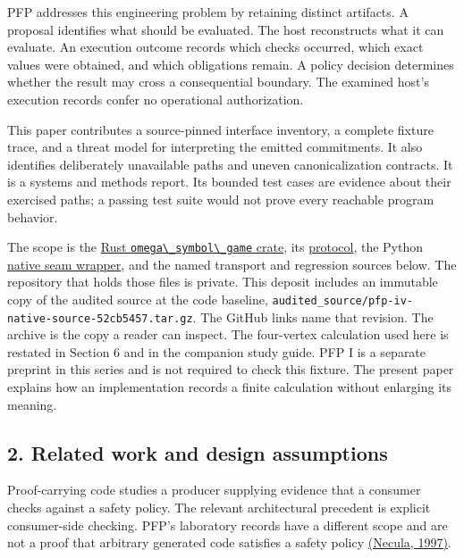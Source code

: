 \documentclass[
  11pt,
]{article}
\newcommand{\passthrough}[1]{#1}
\begin{document}
PFP addresses this engineering problem by retaining distinct artifacts.
A proposal identifies what should be evaluated. The host reconstructs
what it can evaluate. An execution outcome records which checks
occurred, which exact values were obtained, and which obligations
remain. A policy decision determines whether the result may cross a
consequential boundary. The examined host's execution records confer no
operational authorization.

This paper contributes a source-pinned interface inventory, a complete
fixture trace, and a threat model for interpreting the emitted
commitments. It also identifies deliberately unavailable paths and
uneven canonicalization contracts. It is a systems and methods report.
Its bounded test cases are evidence about their exercised paths; a
passing test suite would not prove every reachable program behavior.

The scope is the
\href{https://github.com/dbccpage/the_symbol_game/tree/52cb5457f6c485ba548cfd292f6012a941ed22cf/omega_engine/crates_rs/omega_symbol_game}{Rust
\passthrough{\lstinline!omega\_symbol\_game!} crate}, its
\href{https://github.com/dbccpage/the_symbol_game/blob/52cb5457f6c485ba548cfd292f6012a941ed22cf/omega_engine/crates_rs/omega_symbol_game/src/protocol.rs}{protocol},
the Python
\href{https://github.com/dbccpage/the_symbol_game/blob/52cb5457f6c485ba548cfd292f6012a941ed22cf/omega_engine_symbol_game/ffi.py}{native
seam wrapper}, and the named transport and regression sources below. The
repository that holds those files is private. This deposit includes an
immutable copy of the audited source at the code baseline,
\nolinkurl{audited_source/pfp-iv-native-source-52cb5457.tar.gz}. The GitHub
links name that revision. The archive is the copy a reader can inspect.
The four-vertex calculation used here is restated in Section 6 and in
the companion study guide. PFP I is a separate preprint in this series
and is not required to check this fixture. The present paper explains
how an implementation records a finite calculation without enlarging its
meaning.

\subsection{2. Related work and design
assumptions}\label{related-work-and-design-assumptions}

Proof-carrying code studies a producer supplying evidence that a
consumer checks against a safety policy. The relevant architectural
precedent is explicit consumer-side checking. PFP's laboratory records
have a different scope and are not a proof that arbitrary generated code
satisfies a safety policy
\href{https://doi.org/10.1145/263699.263712}{(Necula, 1997)}.
\end{document}
